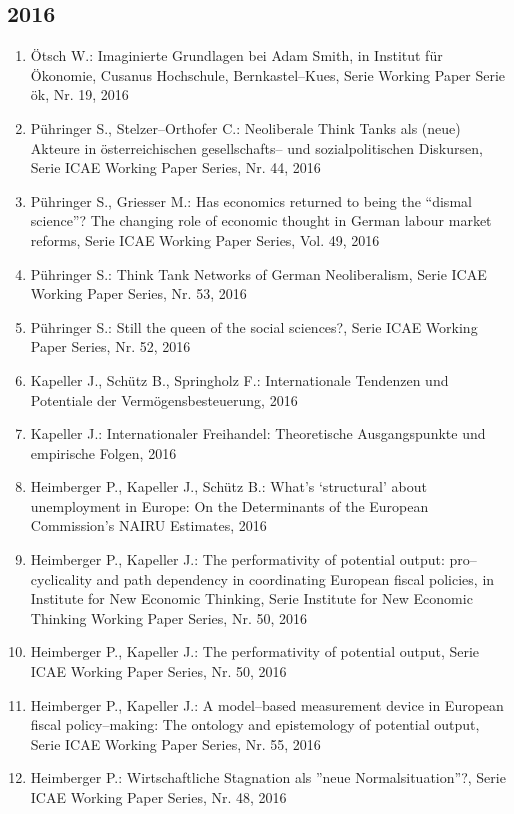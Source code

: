 \subsection*{2016}
\begin{enumerate}
    	 \item Ötsch W.: Imaginierte Grundlagen bei Adam Smith, in Institut für Ökonomie, Cusanus Hochschule, Bernkastel--Kues, Serie Working Paper Serie ök, Nr. 19, 2016
	 \item Pühringer S., Stelzer--Orthofer C.: Neoliberale Think Tanks als (neue) Akteure in österreichischen gesellschafts-- und sozialpolitischen Diskursen, Serie ICAE Working Paper Series, Nr. 44, 2016
	 \item Pühringer S., Griesser M.: Has economics returned to being the “dismal science”? The changing role of economic thought in German labour market reforms, Serie ICAE Working Paper Series, Vol. 49, 2016
	 \item Pühringer S.: Think Tank Networks of German Neoliberalism, Serie ICAE Working Paper Series, Nr. 53, 2016
	 \item Pühringer S.: Still the queen of the social sciences?, Serie ICAE Working Paper Series, Nr. 52, 2016
	 \item Kapeller J., Schütz B., Springholz F.: Internationale Tendenzen und Potentiale der Vermögensbesteuerung, 2016
	 \item Kapeller J.: Internationaler Freihandel: Theoretische Ausgangspunkte und empirische Folgen, 2016
	 \item Heimberger P., Kapeller J., Schütz B.: What’s ‘structural’ about unemployment in Europe: On the Determinants of the European Commission’s NAIRU Estimates, 2016
	 \item Heimberger P., Kapeller J.: The performativity of potential output: pro--cyclicality and path dependency in coordinating European fiscal policies, in Institute for New Economic Thinking, Serie Institute for New Economic Thinking  Working Paper Series, Nr. 50, 2016
	 \item Heimberger P., Kapeller J.: The performativity of potential output, Serie ICAE Working Paper Series, Nr. 50, 2016
	 \item Heimberger P., Kapeller J.: A model--based measurement device in European fiscal policy--making: The ontology and epistemology of potential output, Serie ICAE Working Paper Series, Nr. 55, 2016
	 \item Heimberger P.: Wirtschaftliche Stagnation als ''neue Normalsituation''?, Serie ICAE Working Paper Series, Nr. 48, 2016

\end{enumerate}
